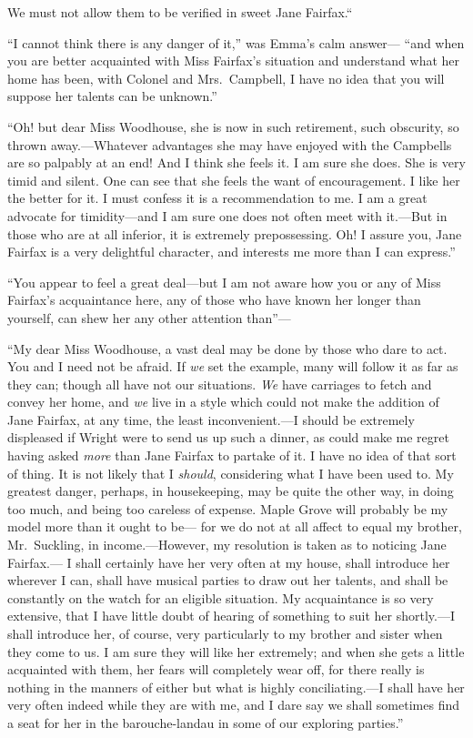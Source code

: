 We must not allow them to be verified in sweet Jane Fairfax.``

``I cannot think there is any danger of it,'' was Emma's calm answer---%
``and when you are better acquainted with Miss Fairfax's situation
and understand what her home has been, with Colonel and Mrs.\ Campbell,
I have no idea that you will suppose her talents can be unknown.''

``Oh! but dear Miss Woodhouse, she is now in such retirement,
such obscurity, so thrown away.---Whatever advantages she may have
enjoyed with the Campbells are so palpably at an end!  And I think
she feels it.  I am sure she does.  She is very timid and silent.
One can see that she feels the want of encouragement.  I like her
the better for it.  I must confess it is a recommendation to me.
I am a great advocate for timidity---and I am sure one does
not often meet with it.---But in those who are at all inferior,
it is extremely prepossessing.  Oh!  I assure you, Jane Fairfax
is a very delightful character, and interests me more than I
can express.''

``You appear to feel a great deal---but I am not aware how you or any
of Miss Fairfax's acquaintance here, any of those who have known
her longer than yourself, can shew her any other attention than''---%

``My dear Miss Woodhouse, a vast deal may be done by those who dare
to act.  You and I need not be afraid.  If \emph{we} set the example,
many will follow it as far as they can; though all have not
our situations.  \emph{We} have carriages to fetch and convey her home,
and \emph{we} live in a style which could not make the addition of
Jane Fairfax, at any time, the least inconvenient.---I should be
extremely displeased if Wright were to send us up such a dinner,
as could make me regret having asked \emph{more} than Jane Fairfax
to partake of it.  I have no idea of that sort of thing.  It is
not likely that I \emph{should}, considering what I have been used to.
My greatest danger, perhaps, in housekeeping, may be quite the
other way, in doing too much, and being too careless of expense.
Maple Grove will probably be my model more than it ought to be---%
for we do not at all affect to equal my brother, Mr.\ Suckling,
in income.---However, my resolution is taken as to noticing Jane Fairfax.---%
I shall certainly have her very often at my house, shall introduce
her wherever I can, shall have musical parties to draw out her talents,
and shall be constantly on the watch for an eligible situation.
My acquaintance is so very extensive, that I have little doubt
of hearing of something to suit her shortly.---I shall introduce her,
of course, very particularly to my brother and sister when they come
to us.  I am sure they will like her extremely; and when she gets
a little acquainted with them, her fears will completely wear off,
for there really is nothing in the manners of either but what is
highly conciliating.---I shall have her very often indeed while they
are with me, and I dare say we shall sometimes find a seat for her in
the barouche-landau in some of our exploring parties.''

